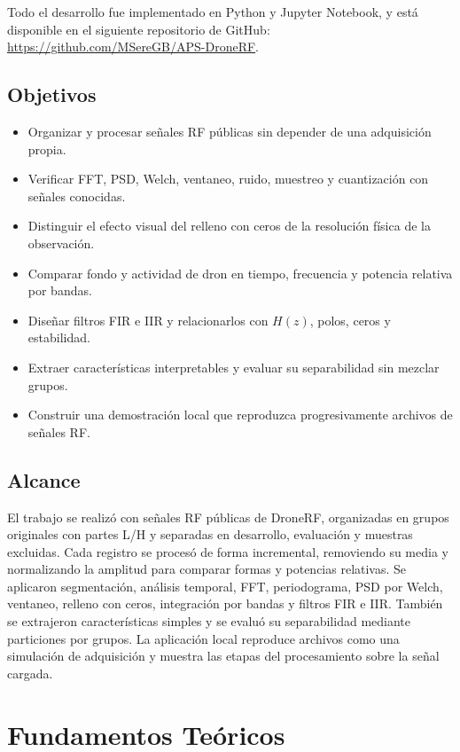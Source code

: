 \documentclass[11pt,a4paper]{article}
\begin{document}
Todo el desarrollo fue implementado en Python y Jupyter Notebook, y está disponible en
el siguiente repositorio de GitHub: \url{https://github.com/MSereGB/APS-DroneRF}.

\subsection{Objetivos}

\begin{itemize}
  \item Organizar y procesar señales RF públicas sin depender de una adquisición propia.
  \item Verificar FFT, PSD, Welch, ventaneo, ruido, muestreo y cuantización con señales conocidas.
  \item Distinguir el efecto visual del relleno con ceros de la resolución física de la observación.
  \item Comparar fondo y actividad de dron en tiempo, frecuencia y potencia relativa por bandas.
  \item Diseñar filtros FIR e IIR y relacionarlos con $H(z)$, polos, ceros y estabilidad.
  \item Extraer características interpretables y evaluar su separabilidad sin mezclar grupos.
  \item Construir una demostración local que reproduzca progresivamente archivos de señales RF.
\end{itemize}

\subsection{Alcance}

El trabajo se realizó con señales RF públicas de DroneRF, organizadas en grupos originales
con partes L/H y separadas en desarrollo, evaluación y muestras excluidas. Cada registro se
procesó de forma incremental, removiendo su media y normalizando la amplitud para comparar
formas y potencias relativas. Se aplicaron segmentación, análisis temporal, FFT,
periodograma, PSD por Welch, ventaneo, relleno con ceros, integración por bandas y filtros FIR
e IIR. También se extrajeron características simples y se evaluó su separabilidad mediante
particiones por grupos. La aplicación local reproduce archivos como una simulación de
adquisición y muestra las etapas del procesamiento sobre la señal cargada.

\section{Fundamentos Teóricos}
\end{document}
